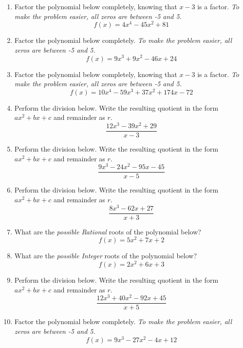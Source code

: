 \documentclass[14pt]{extbook}
\begin{document}
\begin{enumerate}
\item{
Factor the polynomial below completely, knowing that $x -3$ is a factor. \textit{To make the problem easier, all zeros are between -5 and 5.}\[ f(x) = 4x^{4} -45 x^{2} + 81 \]} \newpage
\item{
Factor the polynomial below completely. \textit{To make the problem easier, all zeros are between -5 and 5.}\[ f(x) = 9x^{3} +9 x^{2} -46 x + 24 \]} \newpage
\item{
Factor the polynomial below completely, knowing that $x -3$ is a factor. \textit{To make the problem easier, all zeros are between -5 and 5.}\[ f(x) = 10x^{4} -59 x^{3} +37 x^{2} +174 x -72 \]} \newpage
\item{
Perform the division below. Write the resulting quotient in the form $ax^2+bx+c$ and remainder as $r$.\[ \frac{12x^{3} -39 x^{2} + 29}{x -3} \]} \newpage
\item{
Perform the division below. Write the resulting quotient in the form $ax^2+bx+c$ and remainder as $r$.\[ \frac{9x^{3} -24 x^{2} -95 x -45}{x -5} \]} \newpage
\item{
Perform the division below. Write the resulting quotient in the form $ax^2+bx+c$ and remainder as $r$.\[ \frac{8x^{3} -62 x + 27}{x + 3} \]} \newpage
\item{
What are the \textit{possible Rational} roots of the polynomial below?\[ f(x) = 5x^{2} +7 x + 2 \]} \newpage
\item{
What are the \textit{possible Integer} roots of the polynomial below?\[ f(x) = 2x^{2} +6 x + 3 \]} \newpage
\item{
Perform the division below. Write the resulting quotient in the form $ax^2+bx+c$ and remainder as $r$.\[ \frac{12x^{3} +40 x^{2} -92 x + 45}{x + 5} \]} \newpage
\item{
Factor the polynomial below completely. \textit{To make the problem easier, all zeros are between -5 and 5.}\[ f(x) = 9x^{3} -27 x^{2} -4 x + 12 \]} \newpage
\end{enumerate}
\end{document}
